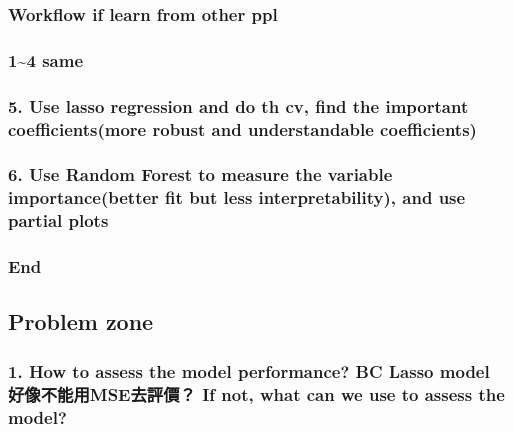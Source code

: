 \documentclass[
]{article}
\begin{document}
\hypertarget{workflow-if-learn-from-other-ppl}{%
\subsubsection{Workflow if learn from other
ppl}\label{workflow-if-learn-from-other-ppl}}

\hypertarget{same}{%
\subsubsection{1\textasciitilde4 same}\label{same}}

\hypertarget{use-lasso-regression-and-do-th-cv-find-the-important-coefficientsmore-robust-and-understandable-coefficients}{%
\subsubsection{5. Use lasso regression and do th cv, find the important
coefficients(more robust and understandable
coefficients)}\label{use-lasso-regression-and-do-th-cv-find-the-important-coefficientsmore-robust-and-understandable-coefficients}}

\hypertarget{use-random-forest-to-measure-the-variable-importancebetter-fit-but-less-interpretability-and-use-partial-plots}{%
\subsubsection{6. Use Random Forest to measure the variable
importance(better fit but less interpretability), and use partial
plots}\label{use-random-forest-to-measure-the-variable-importancebetter-fit-but-less-interpretability-and-use-partial-plots}}

\hypertarget{end}{%
\subsubsection{End}\label{end}}

\hypertarget{problem-zone}{%
\subsection{Problem zone}\label{problem-zone}}

\hypertarget{how-to-assess-the-model-performance-bc-lasso-model-ux597dux50cfux4e0dux80fdux7528mseux53bbux8a55ux50f9-if-not-what-can-we-use-to-assess-the-model}{%
\subsubsection{1. How to assess the model performance? BC Lasso model
好像不能用MSE去評價？ If not, what can we use to assess the
model?}\label{how-to-assess-the-model-performance-bc-lasso-model-ux597dux50cfux4e0dux80fdux7528mseux53bbux8a55ux50f9-if-not-what-can-we-use-to-assess-the-model}}
\end{document}
